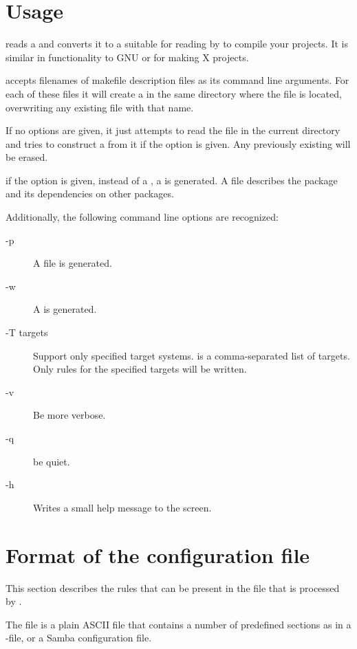 \section{Usage}
 reads a  and converts it to a
 suitable for reading by \gnu {}
to compile your projects. It is similar in functionality to GNU
 or  for making X projects.

\fpcmake{} accepts filenames of makefile description files
as its command line arguments. For each of these files it will
create a  in the same directory where the file is
located, overwriting any existing file with that name.

If no options are given, it just attempts to read the file
 in the current directory and tries to
construct a  from it if the  option is
given. Any previously existing  will be erased.

if the  option is given, instead of a , a
 is generated. A  file describes the
package and its dependencies on other packages.

Additionally, the following command line options are recognized:
\begin{description}
\item[-p] A  file is generated.
\item[-w] A  is generated.
\item[-T targets] Support only specified target systems.  is a
comma-separated list of targets. Only rules for the specified targets
will be written.
\item[-v] Be more verbose.
\item[-q] be quiet.
\item[-h] Writes a small help message to the screen.
\end{description}

\section{Format of the configuration file}
This section describes the rules that can be present in the file
that is processed by \fpcmake{}.

The file  is a plain ASCII file that contains
a number of predefined sections as in a \windows {}-file,
or a Samba configuration file.

